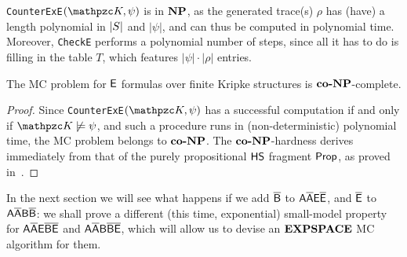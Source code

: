 \texttt{CounterExE}$(\Ku,\psi)$ is in $\textbf{NP}$, as the generated trace(s) $\rho$ has (have) a length polynomial in $|S|$ and $|\psi|$, and can thus be computed in polynomial time. Moreover, \texttt{CheckE} performs a polynomial number of steps, since all it has to do is filling in the table $T$, which features $|\psi|\cdot |\rho|$ entries.

\begin{corollary}\label{cor:E}
The MC problem for $\mathsf{E}$ formulas over finite Kripke structures is $\textbf{co-}\textbf{NP}$-complete.
\end{corollary}
\begin{proof}
Since \texttt{CounterExE}$(\Ku,\psi)$ has a successful computation if and only if $\Ku\not\models \psi$, and such a procedure runs in (non-deterministic) polynomial time, the MC problem belongs to $\textbf{co-}\textbf{NP}$. 
%
The $\textbf{co-}\textbf{NP}$-hardness derives immediately from that of the purely propositional $\text{\sffamily HS}$ fragment $\mathsf{Prop}$, as proved in~\cite{MMP15B}.
\end{proof}

In the next section we will see what happens if we add $\mathsf{\overline{B}}$ to $\mathsf{A\overline{A}E\overline{E}}$, and $\mathsf{\overline{E}}$ to $\mathsf{A\overline{A}B\overline{B}}$: we shall prove a different (this time, exponential) small-model property for $\mathsf{A\overline{A}E\overline{B}\overline{E}}$ and $\mathsf{A\overline{A}B\overline{B}\overline{E}}$, which will allow us to devise an $\textbf{EXPSPACE}$ MC algorithm for them.